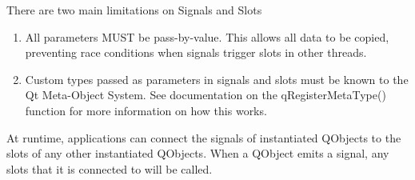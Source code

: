 There are two main limitations on Signals and Slots
\begin{enumerate}
	\item All parameters MUST be pass-by-value. This allows all data to be copied, preventing race conditions when signals trigger slots in other threads.
	\item Custom types passed as parameters in signals and slots must be known to the Qt Meta-Object System. See documentation on the qRegisterMetaType() function for more information on how this works.
\end{enumerate}

At runtime, applications can connect the signals of instantiated QObjects to the slots of any other instantiated QObjects. When a QObject emits a signal, any slots that it is connected to will be called.


